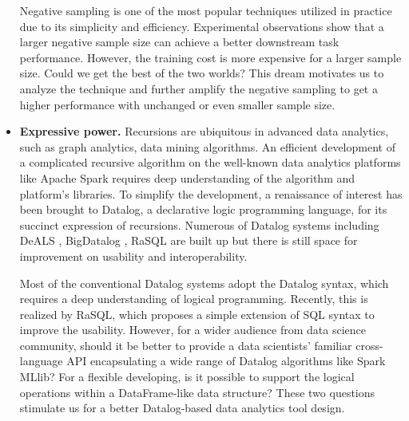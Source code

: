 \documentclass [PhD] {uclathes}
\begin{document}
\begin{itemize}
	Negative sampling is one of the most popular techniques utilized in practice due to its simplicity and efficiency. Experimental observations show that a larger negative sample size can achieve a better downstream task performance. However, the training cost is more expensive for a larger sample size. Could we get the best of the two worlds? This dream motivates us to analyze the technique and further amplify the negative sampling to get a higher performance with unchanged or even smaller sample size. 
	
	

	
	\item \textbf{Expressive power.} Recursions are ubiquitous in advanced data analytics, such as graph analytics,  
	data mining algorithms. An efficient development of a complicated recursive algorithm on the well-known data analytics platforms like Apache Spark requires deep understanding of the algorithm and platform's libraries. To simplify the development,  a renaissance of interest has been brought to Datalog, a declarative logic programming language, for its succinct expression of recursions. Numerous of Datalog systems including DeALS \citep{yang2015parallel}, BigDatalog \citep{shkapsky2016big}, RaSQL \citep{gu2019rasql} are built up but there is still space for improvement on usability and interoperability.
	
	Most of the conventional Datalog systems adopt the Datalog syntax, which requires a deep understanding of logical programming. Recently, this is realized by RaSQL, which proposes a simple extension of  SQL syntax to improve the usability.  However, for a wider audience from data science community, should it be better to  provide a  data scientists' familiar cross-language API encapsulating a wide range of Datalog algorithms like Spark MLlib? For a flexible developing, is it possible to support the logical operations within a DataFrame-like  data structure? These two questions stimulate us for a better Datalog-based data analytics tool design.

\end{itemize}
\end{document}
